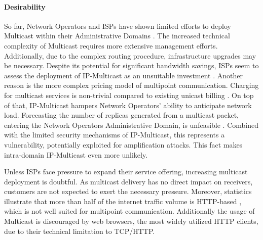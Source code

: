 \paragraph{Desirability} %
\label{par:Desirability}


So far, Network Operators and ISPs have shown limited efforts to deploy
    Multicast within their Administrative Domains
    \cite{diot2000deployment, ratnasamy2006revisiting}.
The increased technical complexity of Multicast requires more extensive
    management efforts.
Additionally, due to the complex routing procedure, infrastructure upgrades may
    be necessary.
Despite its potential for significant bandwidth savings, ISPs seem to assess
    the deployment of IP-Multicast as an unsuitable investment
    \cite{ratnasamy2006revisiting}.
Another reason is the more complex pricing model of multipoint communication.
Charging for multicast services is non-trivial compared to existing unicast
    billing \cite{ratnasamy2006revisiting}.
On top of that, IP-Multicast hampers Network Operators' ability to anticipate
    network load.
Forecasting the number of replicas generated from a multicast packet, entering
    the Network Operators Administrative Domain, is unfeasible
    \cite{diot2000deployment}.
Combined with the limited security mechanisms of IP-Multicast, this represents
    a vulnerability, potentially exploited for amplification attacks.
This fact makes intra-domain IP-Multicast even more unlikely.

Unless ISPs face pressure to expand their service offering, increasing
    multicast deployment is doubtful.
As multicast delivery has no direct impact on receivers, customers are not 
    expected to exert the necessary pressure.
Moreover, statistics illustrate that more than half of the internet traffic
    volume is HTTP-based \cite{cloudflare2023radar}, which is not well suited
    for multipoint communication.
Additionally the usage of Multicast is discouraged by web browsers, the most 
    widely utilized HTTP clients, due to their technical limitation to
    TCP/HTTP.


